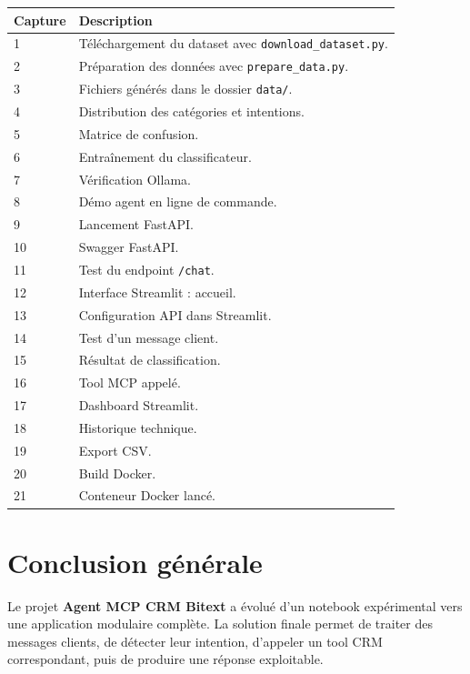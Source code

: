 \documentclass[12pt,a4paper]{report}
\begin{document}
\begin{longtable}{|p{}|p{}|}
\hline
\textbf{Capture} & \textbf{Description} \\
\hline
1 & Téléchargement du dataset avec \texttt{download\_dataset.py}. \\
\hline
2 & Préparation des données avec \texttt{prepare\_data.py}. \\
\hline
3 & Fichiers générés dans le dossier \texttt{data/}. \\
\hline
4 & Distribution des catégories et intentions. \\
\hline
5 & Matrice de confusion. \\
\hline
6 & Entraînement du classificateur. \\
\hline
7 & Vérification Ollama. \\
\hline
8 & Démo agent en ligne de commande. \\
\hline
9 & Lancement FastAPI. \\
\hline
10 & Swagger FastAPI. \\
\hline
11 & Test du endpoint \texttt{/chat}. \\
\hline
12 & Interface Streamlit : accueil. \\
\hline
13 & Configuration API dans Streamlit. \\
\hline
14 & Test d'un message client. \\
\hline
15 & Résultat de classification. \\
\hline
16 & Tool MCP appelé. \\
\hline
17 & Dashboard Streamlit. \\
\hline
18 & Historique technique. \\
\hline
19 & Export CSV. \\
\hline
20 & Build Docker. \\
\hline
21 & Conteneur Docker lancé. \\
\hline
\end{longtable}

\chapter*{Conclusion générale}

Le projet \textbf{Agent MCP CRM Bitext} a évolué d'un notebook expérimental vers une application modulaire complète. La solution finale permet de traiter des messages clients, de détecter leur intention, d'appeler un tool CRM correspondant, puis de produire une réponse exploitable.
\end{document}
